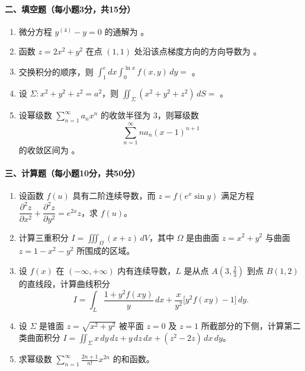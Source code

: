 \paragraph*{二、填空题（每小题3分，共15分）}
\begin{enumerate}
  \item 微分方程 $y^{(4)}-y=0$ 的通解为 \underline{\hspace{5cm}}。
  \item 函数 $z=2x^2+y^2$ 在点 $(1,1)$ 处沿该点梯度方向的方向导数为 \underline{\hspace{5cm}}。
  \item 交换积分的顺序，则 $\displaystyle\int_1^e dx\int_0^{\ln x} f(x,y)\,dy=$ \underline{\hspace{5cm}}。
  \item 设 $\Sigma:x^2+y^2+z^2=a^2$，则 $\displaystyle\iint_{\Sigma}(x^2+y^2+z^2)\,dS=$ \underline{\hspace{5cm}}。
  \item 设幂级数 $\displaystyle\sum_{n=1}^{\infty}a_nx^n$ 的收敛半径为 $3$，则幂级数
  \[
    \sum_{n=1}^{\infty}n a_n(x-1)^{n+1}
  \]
  的收敛区间为 \underline{\hspace{5cm}}。
\end{enumerate}

\paragraph*{三、计算题（每小题10分，共50分）}
\begin{enumerate}
  \item 设函数 $f(u)$ 具有二阶连续导数，而 $z=f(e^x\sin y)$ 满足方程 $\dfrac{\partial^2 z}{\partial x^2}+\dfrac{\partial^2 z}{\partial y^2}=e^{2x}z$，求 $f(u)$。
  \item 计算三重积分 $I=\displaystyle\iiint_{\Omega}(x+z)\,dV$，其中 $\Omega$ 是由曲面 $z=x^2+y^2$ 与曲面 $z=1-x^2-y^2$ 所围成的区域。
  \item 设 $f(x)$ 在 $(-\infty,+\infty)$ 内有连续导数，$L$ 是从点 $A(3,\frac23)$ 到点 $B(1,2)$ 的直线段，计算曲线积分
  \[
    I=\int_L \frac{1+y^2f(xy)}{y}\,dx
    +\frac{x}{y^2}\bigl[y^2f(xy)-1\bigr]\,dy.
  \]
  \item 设 $\Sigma$ 是锥面 $z=\sqrt{x^2+y^2}$ 被平面 $z=0$ 及 $z=1$ 所截部分的下侧，计算第二类曲面积分 $I=\displaystyle\iint_{\Sigma}x\,dy\,dz+y\,dz\,dx+(z^2-2z)\,dx\,dy$。
  \item 求幂级数 $\displaystyle\sum_{n=1}^{\infty}\frac{2n+1}{n!}x^{2n}$ 的和函数。
\end{enumerate}

